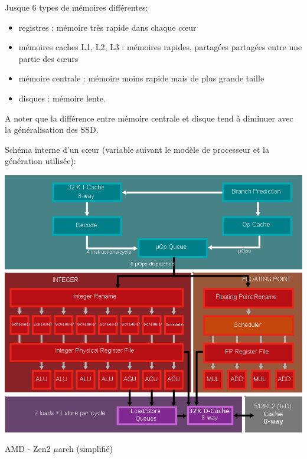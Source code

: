 \documentclass{beamer}
\begin{document}
\begin{frame}
\end{frame}

\begin{frame}[fragile]
Jusque 6 types de mémoires différentes:
\begin{itemize}
\item registres : mémoire très rapide dans chaque cœur
\item mémoires caches L1, L2, L3 : mémoires rapides, partagées partagées entre une partie des cœurs
\item mémoire centrale : mémoire moins rapide mais de plus grande taille
\item disques : mémoire lente.
\end{itemize}

A noter que la différence entre mémoire centrale et disque tend à diminuer avec la généralisation des SSD.

\bigskip
\begin{center}
	\framebox{%
	\begin{minipage}{9cm}
	\textcolor{red}{Les échanges entre la mémoire centrale et les mémoires cache se font par blocs de données (appelées ``lignes de cache'') et pas ``à l'unité'' pour des raisons de performances.}
    \end{minipage}
    }
\end{center}

\end{frame}

\begin{frame}
Schéma interne d'un c\oe ur (variable suivant le mod\`ele de processeur et la g\'en\'eration utilis\'ee):

\begin{center}
	\includegraphics[scale=0.25]{../../Images/800px-Zen2_Microarchitektur.svg.png}
	
	AMD - Zen2 $\mu$arch (simplifi\'e)
\end{center}

\end{frame}
\end{document}
